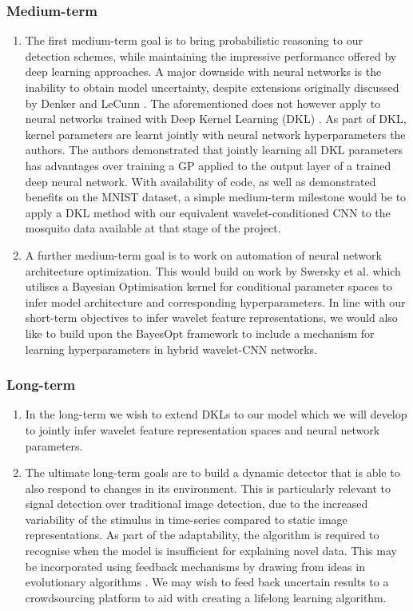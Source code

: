 \documentclass[12pt]{llncs}
\newcommand{\ikn}[1]{\todo[size = \small, color=orange!30]{[ik] #1}}
\begin{document}
\subsubsection{Medium-term}
\begin{enumerate}
	\item The first medium-term goal is to bring probabilistic reasoning to our detection schemes, while maintaining the impressive performance offered by deep learning approaches. A major downside with neural networks is the inability to obtain model uncertainty, despite extensions originally discussed by Denker and LeCunn \cite{denker1991transforming}. The aforementioned does not however apply %
	to neural networks trained with Deep Kernel Learning (DKL) \cite{wilson2016deep}. As part of DKL, kernel parameters are learnt jointly with neural network hyperparameters the authors. The authors demonstrated that jointly learning all DKL parameters has advantages over training a GP applied to the output layer of a trained deep neural network. With availability of code, as well as demonstrated benefits on the MNIST dataset, a simple medium-term milestone would be to apply a DKL method with our equivalent wavelet-conditioned CNN to the mosquito data available at that stage of the project. 
	\item A further medium-term goal is to work on automation of neural network architecture optimization. This would build on work by Swersky et al. \cite{swersky2014raiders} which utilises a Bayesian Optimisation kernel \cite{snoek2012practical} for conditional parameter spaces to infer model architecture and corresponding hyperparameters. In line with our short-term objectives to infer wavelet feature representations, we would also like to build upon the BayesOpt framework to include a mechanism for learning hyperparameters in hybrid wavelet-CNN networks.

\end{enumerate}
\subsubsection{Long-term}
\begin{enumerate}
	\item In the long-term we wish to extend DKLs to our model which we will develop to jointly infer wavelet feature representation spaces and neural network parameters.
	\item The ultimate long-term goals are to build a dynamic detector that is able to also respond to changes in its environment. This is particularly relevant to signal detection over traditional image detection, due to the increased variability of the stimulus in time-series compared to static image representations. As part of the adaptability, the algorithm is required to recognise when the model is insufficient for explaining novel data. This may be incorporated using feedback mechanisms by drawing from ideas in evolutionary algorithms \cite{coello2007evolutionary}. We may wish to feed back uncertain results to a crowdsourcing platform to aid with creating a lifelong learning algorithm.
\end{enumerate}
\end{document}

